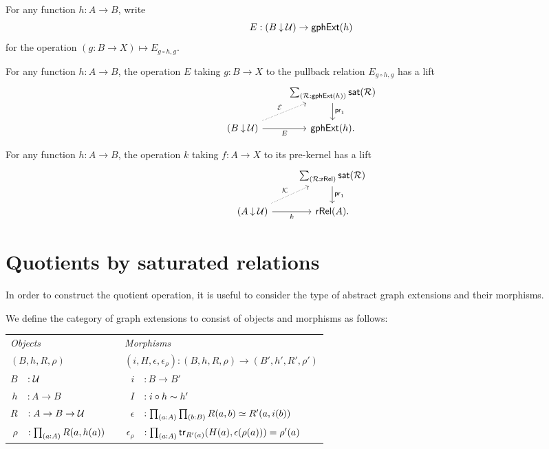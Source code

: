 For any function $h:A\to B$, write 
\begin{equation*}
E: (B\mathbin{\downarrow}\mathcal{U}) \to \mathsf{gphExt}(h)
\end{equation*}
for the operation $(g:B\to X)\mapsto E_{g\circ h,g}$.

\begin{cor}
For any function $h:A\to B$, the operation $E$ taking $g:B\to X$ to the pullback relation $E_{g\circ h,g}$ has a lift
\begin{equation*}
\begin{tikzcd}
& \sm{\mathcal{R}:\mathsf{gphExt}(h)}\mathsf{sat}(\mathcal{R}) \arrow[d,"\proj 1"] \\
(B\mathbin{\downarrow}\UU) \arrow[r,swap,"E"] \arrow[ur,densely dotted,"\mathcal{E}"] & \mathsf{gphExt}(h).
\end{tikzcd}
\end{equation*}
\end{cor}

\begin{cor}
For any function $h:A\to B$, the operation $k$ taking $f:A\to X$ to its pre-kernel has a lift
\begin{equation*}
\begin{tikzcd}
& \sm{\mathcal{R}:\mathsf{rRel}}\mathsf{sat}(\mathcal{R}) \arrow[d,"\proj 1"] \\
(A\mathbin{\downarrow}\UU) \arrow[r,swap,"k"] \arrow[ur,densely dotted,"\mathcal{K}"] & \mathsf{rRel}(A).
\end{tikzcd}
\end{equation*}
\end{cor}

\section{Quotients by saturated relations}

In order to construct the quotient operation, it is useful to consider the type of abstract graph extensions and their morphisms.

\begin{defn}
We define the category of graph extensions to consist of objects and morphisms as follows:
\begin{center}
\begin{tabular}{rlcrl}
\toprule
\multicolumn{2}{l}{\emph{Objects}} & & \multicolumn{2}{l}{\emph{Morphisms}} \\
\multicolumn{2}{l}{$(B,h,R,\rho)$} & & \multicolumn{2}{l}{$(i,H,\epsilon,\epsilon_\rho):(B,h,R,\rho)\to(B',h',R',\rho')$} \\
\midrule
$B$ & $:\mathcal{U}$ & & $i$ & $:B\to B'$\\
$h$ & $:A\to B$ & & $I$ & $:i\circ h\sim h'$ \\
$R$ & $:A\to B\to\mathcal{U}$ & & $\epsilon$ & $: \prd{a:A}{b:B}R(a,b)\eqvsym R'(a,i(b))$ \\
$\rho$ & $: \prd{a:A}R(a,h(a))$ & & $\epsilon_\rho$ & $: \prd{a:A} \mathsf{tr}_{R'(a)}(H(a),\epsilon(\rho(a)))=\rho'(a)$ \\
\bottomrule
\end{tabular}
\end{center}
\end{defn}

